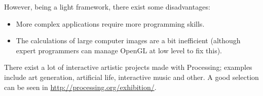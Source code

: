 \documentclass[a4paper,twoside]{article}
\begin{document}
However, being a light framework, there exist some disadvantages:
\begin{itemize}
\item More complex applications require more programming skills.
\item The calculations of large computer images are a bit inefficient (although expert programmers can manage OpenGL at low level to fix this).
\end{itemize}

There exist a lot of interactive artistic projects made with Processing; examples include art generation, artificial life, interactive music and other. A good selection can be seen in \url{http://processing.org/exhibition/}.


\end{document}
